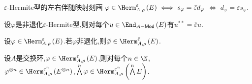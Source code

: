 \begin{proposition}{$\varepsilon$-Hermite型的左右伴随映射刻画}{}
	$\varphi\in\Herm_{A,\rho}^{\varepsilon}\left(E\right)\iff s_{\varphi}=\bar{\varepsilon}d_{\varphi}$ $\iff$ $d_{\varphi}=\varepsilon s_{\varphi}$.
\end{proposition}

\begin{proposition}{}{}
	设$\varphi$是非退化$\varepsilon$-Hermite型,则对每个$u\in\End_{A-\mathsf{Mod}}\left(E\right)$有$u^{\ast\ast}=\bar{\varepsilon}u$.
\end{proposition}

\begin{proposition}{}{}
	设$\varphi\in\Herm_{A,\rho}^{\varepsilon}\left(E\right)$.若$\varphi$非退化,则$\tilde{\varphi}\in\Herm_{A,\rho}^{\bar{\varepsilon}}\left(E\right)$.
\end{proposition}

\begin{proposition}{}{}
	设$A$是交换环,$\varphi\in\Herm_{A,\rho}^{\varepsilon}\left(E\right)$,则对每个$n\in\N$,$\varphi^{\otimes n}\in\Herm_{A,\rho}^{\varepsilon^{n}}\left(E^{\otimes n}\right),\bigwedge\limits^{n}\varphi\in\Herm_{A,\rho}^{\varepsilon^{n}}\left(\bigwedge\limits^{n}E\right)$.
\end{proposition}







